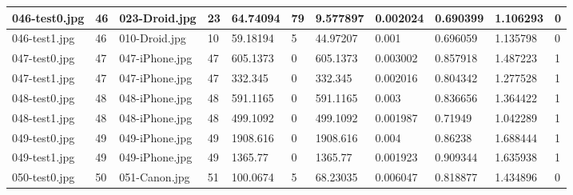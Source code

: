 \begin{landscape}
\begin{longtable}{|p{2cm}|p{1cm}|p{2cm}|p{1cm}|p{2cm}|p{1cm}|p{2cm}|p{2cm}|p{2cm}|p{2cm}|p{1cm}|}
		046-test0.jpg   & 46               & 023-Droid.jpg         & 23                          & 64.74094              & 79                      & 9.577897                   & 0.002024              & 0.690399              & 1.106293                 & 0                \\ \hline
		046-test1.jpg   & 46               & 010-Droid.jpg         & 10                          & 59.18194              & 5                       & 44.97207                   & 0.001                 & 0.696059              & 1.135798                 & 0                \\ \hline
		047-test0.jpg   & 47               & 047-iPhone.jpg        & 47                          & 605.1373              & 0                       & 605.1373                   & 0.003002              & 0.857918              & 1.487223                 & 1                \\ \hline
		047-test1.jpg   & 47               & 047-iPhone.jpg        & 47                          & 332.345               & 0                       & 332.345                    & 0.002016              & 0.804342              & 1.277528                 & 1                \\ \hline
		048-test0.jpg   & 48               & 048-iPhone.jpg        & 48                          & 591.1165              & 0                       & 591.1165                   & 0.003                 & 0.836656              & 1.364422                 & 1                \\ \hline
		048-test1.jpg   & 48               & 048-iPhone.jpg        & 48                          & 499.1092              & 0                       & 499.1092                   & 0.001987              & 0.71949               & 1.042289                 & 1                \\ \hline
		049-test0.jpg   & 49               & 049-iPhone.jpg        & 49                          & 1908.616              & 0                       & 1908.616                   & 0.004                 & 0.86238               & 1.688444                 & 1                \\ \hline
		049-test1.jpg   & 49               & 049-iPhone.jpg        & 49                          & 1365.77               & 0                       & 1365.77                    & 0.001923              & 0.909344              & 1.635938                 & 1                \\ \hline
		050-test0.jpg   & 50               & 051-Canon.jpg         & 51                          & 100.0674              & 5                       & 68.23035                   & 0.006047              & 0.818877              & 1.434896                 & 0                \\ \hline

\end{longtable}
\end{landscape}
